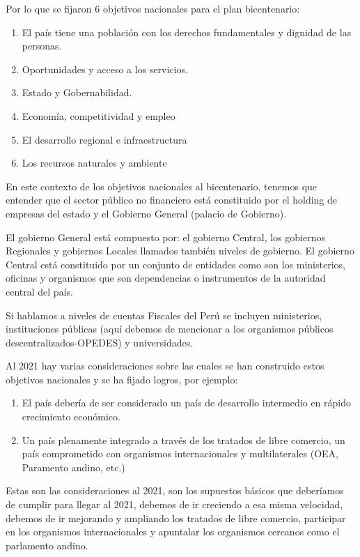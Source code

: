 \documentclass[
  jou,
  floatsintext,
  longtable,
  a4paper,
  nolmodern,
  notxfonts,
  notimes,
  12pt,
  colorlinks=true,linkcolor=blue,citecolor=blue,urlcolor=blue]{apa7}
\providecommand{\tightlist}{%
  \setlength{\itemsep}{0pt}\setlength{\parskip}{0pt}}
\begin{document}
Por lo que se fijaron 6 objetivos nacionales para el plan bicentenario:

\begin{enumerate}
\def\labelenumi{\arabic{enumi}.}
\tightlist
\item
  El país tiene una población con los derechos fundamentales y dignidad
  de las personas.
\item
  Oportunidades y acceso a los servicios.
\item
  Estado y Gobernabilidad.
\item
  Economía, competitividad y empleo
\item
  El desarrollo regional e infraestructura
\item
  Los recursos naturales y ambiente
\end{enumerate}

En este contexto de los objetivos nacionales al bicentenario, tenemos
que entender que el sector público no financiero está constituido por el
holding de empresas del estado y el Gobierno General (palacio de
Gobierno).

El gobierno General está compuesto por: el gobierno Central, los
gobiernos Regionales y gobiernos Locales llamados también niveles de
gobierno. El gobierno Central está constituido por un conjunto de
entidades como son los ministerios, oficinas y organismos que son
dependencias o instrumentos de la autoridad central del país.

Si hablamos a niveles de cuentas Fiscales del Perú se incluyen
ministerios, instituciones públicas (aquí debemos de mencionar a los
organismos públicos descentralizados-OPEDES) y universidades.

Al 2021 hay varias consideraciones sobre las cuales se han construido
estos objetivos nacionales y se ha fijado logros, por ejemplo:

\begin{enumerate}
\def\labelenumi{\arabic{enumi}.}
\tightlist
\item
  El país debería de ser considerado un país de desarrollo intermedio en
  rápido crecimiento económico.
\item
  Un país plenamente integrado a través de los tratados de libre
  comercio, un país comprometido con organismos internacionales y
  multilaterales (OEA, Paramento andino, etc.)
\end{enumerate}

Estas son las consideraciones al 2021, son los supuestos básicos que
deberíamos de cumplir para llegar al 2021, debemos de ir creciendo a esa
misma velocidad, debemos de ir mejorando y ampliando los tratados de
libre comercio, participar en los organismos internacionales y apuntalar
los organismos cercanos como el parlamento andino.
\end{document}
